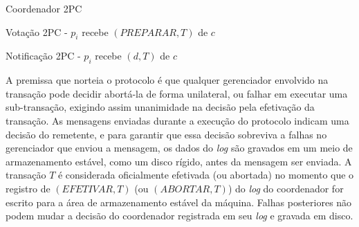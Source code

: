 \documentclass[11pt,twoside,a4paper]{book}
\begin{document}
\begin{algorithm}
\caption{Coordenador 2PC}
\label{alg:2pc_coordenador}
\end{algorithm}

\begin{algorithm}
\caption{Votação 2PC - $p_i$ recebe $(PREPARAR, T)$ de $c$}
\label{alg:2pc_participante1}
\end{algorithm}

\begin{algorithm}
\caption{Notificação 2PC - $p_i$ recebe $(d, T)$ de $c$}
\label{alg:2pc_participante2}
\end{algorithm}

A premissa que norteia o protocolo é que qualquer gerenciador envolvido na transação pode decidir abortá-la de forma unilateral, ou falhar em executar uma sub-transação, exigindo assim unanimidade na decisão pela efetivação da transação. As mensagens enviadas durante a execução do protocolo indicam uma decisão do remetente, e para garantir que essa decisão sobreviva a falhas no gerenciador que enviou a mensagem, os dados do \emph{log} são gravados em um meio de armazenamento estável, como um disco rígido, antes da  mensagem ser enviada. A transação $T$ é considerada oficialmente efetivada (ou abortada) no momento que o registro de $(EFETIVAR, T)$ (ou $(ABORTAR, T)$) do \emph{log} do coordenador for escrito para a área de armazenamento estável da máquina. Falhas posteriores não podem mudar a decisão do coordenador registrada em seu \emph{log} e gravada em disco.
\end{document}

